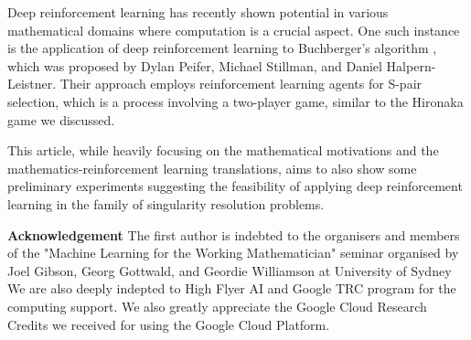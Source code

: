 \documentclass{article}
\theoremstyle{plain}
\theoremstyle{definition}
\theoremstyle{remark}
\begin{document}
Deep reinforcement learning has recently shown potential in various mathematical domains where computation is a crucial aspect. One such instance is the application of deep reinforcement learning to Buchberger's algorithm \cite{buchberger}, which was proposed by Dylan Peifer, Michael Stillman, and Daniel Halpern-Leistner. Their approach employs reinforcement learning agents for S-pair selection, which is a process involving a two-player game, similar to the Hironaka game we discussed.


This article, while heavily focusing on the mathematical motivations and the mathematics-reinforcement learning translations, aims to also show some preliminary experiments suggesting the feasibility of applying deep reinforcement learning in the family of singularity resolution problems. 


\noindent \textbf{Acknowledgement}
The first author is indebted to the organisers and  members of the "Machine Learning for the Working Mathematician" seminar organised by Joel Gibson, Georg Gottwald, and Geordie Williamson at University of Sydney \cite{mlwm}  We are also deeply indepted to High Flyer AI and Google TRC program for the computing support.  
We also greatly appreciate the Google Cloud Research Credits we received for using the Google Cloud Platform.







\end{document}
